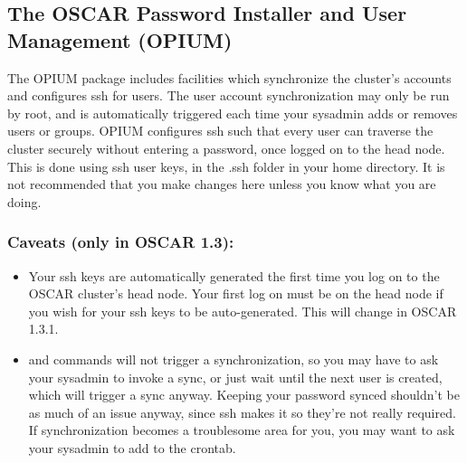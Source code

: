 %
%
%

\subsection{The OSCAR Password Installer and User Management (OPIUM)}
\label{app:opium-overview}

The OPIUM package includes facilities which synchronize the cluster's 
accounts and configures ssh for users.  The user account synchronization
may only be run by root, and is automatically triggered each time your
sysadmin adds or removes users or groups.  OPIUM configures ssh such that
every user can traverse the cluster securely without entering a password,
once logged on to the head node.  This is done using ssh user keys, in
the .ssh folder in your home directory.  It is not recommended that you
make changes here unless you know what you are doing.

\subsubsection{Caveats (only in OSCAR 1.3):}
\begin{itemize}
\item Your ssh keys are automatically generated the first time you log on to
the OSCAR cluster's head node.  Your first log on must be on the head
node if you wish for your ssh keys to be auto-generated.  This will 
change in OSCAR 1.3.1.
\item {} and  commands will not trigger a synchronization,
so you may have to ask your sysadmin to invoke a sync, or
just wait until the next user is created, which will trigger a sync anyway.
Keeping your password synced shouldn't be as much of an issue anyway, since
ssh makes it so they're not really required.  If synchronization becomes
a troublesome area for you, you may want to ask your sysadmin to add
 to the crontab.
\end{itemize}


